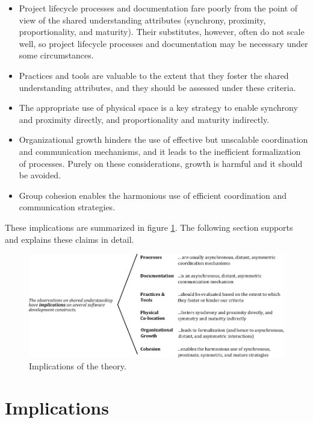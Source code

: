 \begin{itemize}
\item Project lifecycle processes and documentation fare poorly from the point of view of the shared understanding attributes (synchrony, proximity, proportionality, and maturity). Their substitutes, however, often do not scale well, so project lifecycle processes and documentation may be necessary under some circumstances.

\item Practices and tools are valuable to the extent that they foster the shared understanding attributes, and they should be assessed under these criteria.

\item The appropriate use of physical space is a key strategy to enable synchrony and proximity directly, and proportionality and maturity indirectly.

\item Organizational growth hinders the use of effective but unscalable coordination and communication mechanisms, and it leads to the inefficient formalization of processes. Purely on these considerations, growth is harmful and it should be avoided.

\item Group cohesion enables the harmonious use of efficient coordination and communication strategies.

\end{itemize}

These implications are summarized in figure \ref{fig:Schema2}. The following section supports and explains these claims in detail.

\begin{figure}[tb]
\centering
\includegraphics[scale=1.0]{su-schema2}
\caption{\label{fig:Schema2}Implications of the theory.}
\end{figure}



\section{Implications}
\label{sec:Implications}


